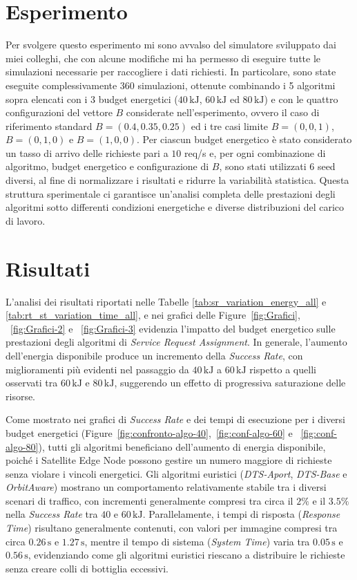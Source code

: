 \documentclass[12pt]{article}
\begin{document}
\section{Esperimento}

Per svolgere questo esperimento mi sono avvalso del simulatore sviluppato dai miei colleghi, che con alcune modifiche mi ha permesso di eseguire tutte le simulazioni necessarie per raccogliere i dati richiesti. In particolare, sono state eseguite complessivamente 360 simulazioni, ottenute combinando i 5 algoritmi sopra elencati con i 3 budget energetici ($40\,\mathrm{kJ}$, $60\,\mathrm{kJ}$ ed $80\,\mathrm{kJ}$) e con le quattro configurazioni del vettore $B$ considerate nell’esperimento, ovvero il caso di riferimento standard $B=(0.4, 0.35, 0.25)$ ed i tre casi limite $B=(0,0,1)$, $B=(0,1,0)$ e $B=(1,0,0)$. Per ciascun budget energetico è stato considerato un tasso di arrivo delle richieste pari a $10$ req/s e, per ogni combinazione di algoritmo, budget energetico e configurazione di $B$, sono stati utilizzati 6 seed diversi, al fine di normalizzare i risultati e ridurre la variabilità statistica. Questa struttura sperimentale ci garantisce un’analisi completa delle prestazioni degli algoritmi sotto differenti condizioni energetiche e diverse distribuzioni del carico di lavoro.


\section{Risultati}

L’analisi dei risultati riportati nelle Tabelle \ref{tab:sr_variation_energy_all} e \ref{tab:rt_st_variation_time_all}, e nei grafici delle Figure~\ref{fig:Grafici}, ~\ref{fig:Grafici-2} e ~\ref{fig:Grafici-3} evidenzia l’impatto del budget energetico sulle prestazioni degli algoritmi di \textit{Service Request Assignment}. In generale, l’aumento dell’energia disponibile produce un incremento della \textit{Success Rate}, con miglioramenti più evidenti nel passaggio da $40\,\mathrm{kJ}$ a $60\,\mathrm{kJ}$ rispetto a quelli osservati tra $60\,\mathrm{kJ}$ e $80\,\mathrm{kJ}$, suggerendo un effetto di progressiva saturazione delle risorse.

Come mostrato nei grafici di \textit{Success Rate} e dei tempi di esecuzione per i diversi budget energetici (Figure~\ref{fig:confronto-algo-40},~\ref{fig:conf-algo-60} e ~\ref{fig:conf-algo-80}), tutti gli algoritmi beneficiano dell’aumento di energia disponibile, poiché i Satellite Edge Node possono gestire un numero maggiore di richieste senza violare i vincoli energetici. Gli algoritmi euristici (\textit{DTS-Aport}, \textit{DTS-Base} e \textit{OrbitAware}) mostrano un comportamento relativamente stabile tra i diversi scenari di traffico, con incrementi generalmente compresi tra circa il $2\%$ e il $3.5\%$ nella \textit{Success Rate} tra $40$ e $60\,\mathrm{kJ}$. Parallelamente, i tempi di risposta (\textit{Response Time}) risultano generalmente contenuti, con valori per immagine compresi tra circa $0.26\,\mathrm{s}$ e $1.27\,\mathrm{s}$, mentre il tempo di sistema (\textit{System Time}) varia tra $0.05\,\mathrm{s}$ e $0.56\,\mathrm{s}$, evidenziando come gli algoritmi euristici riescano a distribuire le richieste senza creare colli di bottiglia eccessivi.
\end{document}
